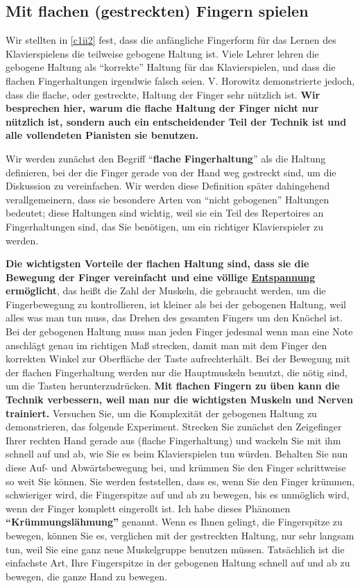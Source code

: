 
\subsection{Mit flachen (gestreckten) Fingern spielen}
\label{c1iii4b}

Wir stellten in \hyperref[c1ii2]{\ref*{c1ii2}} fest, dass die anfängliche Fingerform für das Lernen des Klavierspielens die teilweise gebogene Haltung ist.
Viele Lehrer lehren die gebogene Haltung als \enquote{korrekte} Haltung für das Klavierspielen, und dass die flachen Fingerhaltungen irgendwie falsch seien.
V. Horowitz demonstrierte jedoch, dass die flache, oder gestreckte, Haltung der Finger sehr nützlich ist.
\textbf{Wir besprechen hier, warum die flache Haltung der Finger nicht nur nützlich ist, sondern auch ein entscheidender Teil der Technik ist und alle vollendeten Pianisten sie benutzen.}

Wir werden zunächst den Begriff \enquote{\textbf{flache Fingerhaltung}} als die Haltung definieren, bei der die Finger gerade von der Hand weg gestreckt sind, um die Diskussion zu vereinfachen.
Wir werden diese Definition später dahingehend verallgemeinern, dass sie besondere Arten von \enquote{nicht gebogenen} Haltungen bedeutet; diese Haltungen sind wichtig, weil sie ein Teil des Repertoires an Fingerhaltungen sind, das Sie benötigen, um ein richtiger Klavierspieler zu werden.

\textbf{Die wichtigsten Vorteile der flachen Haltung sind, dass sie die Bewegung der Finger vereinfacht und eine völlige \hyperref[c1ii14]{Entspannung} ermöglicht}, das heißt die Zahl der Muskeln, die gebraucht werden, um die Fingerbewegung zu kontrollieren, ist kleiner als bei der gebogenen Haltung, weil alles was man tun muss, das Drehen des gesamten Fingers um den Knöchel ist.
Bei der gebogenen Haltung muss man jeden Finger jedesmal wenn man eine Note anschlägt genau im richtigen Maß strecken, damit man mit dem Finger den korrekten Winkel zur Oberfläche der Taste aufrechterhält.
Bei der Bewegung mit der flachen Fingerhaltung werden nur die Hauptmuskeln benutzt, die nötig sind, um die Tasten herunterzudrücken.
\textbf{Mit flachen Fingern zu üben kann die Technik verbessern, weil man nur die wichtigsten Muskeln und Nerven trainiert.}
Versuchen Sie, um die Komplexität der gebogenen Haltung zu demonstrieren, das folgende Experiment.
Strecken Sie zunächst den Zeigefinger Ihrer rechten Hand gerade aus (flache Fingerhaltung) und wackeln Sie mit ihm schnell auf und ab, wie Sie es beim Klavierspielen tun würden.
Behalten Sie nun diese Auf- und Abwärtsbewegung bei, und krümmen Sie den Finger schrittweise so weit Sie können.
Sie werden feststellen, dass es, wenn Sie den Finger krümmen, schwieriger wird, die Fingerspitze auf und ab zu bewegen, bis es unmöglich wird, wenn der Finger komplett eingerollt ist.
Ich habe dieses Phänomen \textbf{\enquote{Krümmungslähmung}} genannt.
Wenn es Ihnen gelingt, die Fingerspitze zu bewegen, können Sie es, verglichen mit der gestreckten Haltung, nur sehr langsam tun, weil Sie eine ganz neue Muskelgruppe benutzen müssen.
Tatsächlich ist die einfachste Art, Ihre Fingerspitze in der gebogenen Haltung schnell auf und ab zu bewegen, die ganze Hand zu bewegen.

